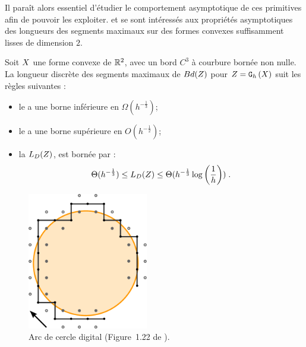 Il paraît alors essentiel d'étudier le comportement asymptotique de ces
primitives afin de pouvoir les exploiter.  et
 se sont intéressés aux
propriétés asymptotiques des longueurs des segments maximaux sur des formes
convexes suffisamment lisses de dimension $2$.
%
\begin{lemma}{}
  \label{lem:law-length-MDSS}
  Soit $X$ une forme convexe de $\mathbb{R}^2$, avec un bord $C^3$ à
  courbure bornée non nulle. La longueur discrète des segments maximaux de
  $Bd({Z})$ pour $Z = \mathtt{G}_{h}\left(X\right)$ suit les règles suivantes :
  \begin{itemize}
    \item le  a une borne inférieure en
    $\Omega(h^{-\frac{1}{3}})$;
    \item le  a une borne supérieure en
    $O(h^{-\frac{1}{2}})$;
    \item la  $L_D({Z})$, est
    bornée par :
    \begin{equation}
      \label{eq:lengthMS}
      \Theta(h^{-\frac{1}{3}}) \le L_D( {Z} ) \le \Theta(h^{-\frac{1}{3}} \log \left(\frac{1}{h}\right))\;.
    \end{equation}
  \end{itemize}
\end{lemma}


\begin{figure}[ht]{
    \begin{center}
    \includegraphics[height=6cm]{figures/DCA}
    \end{center}}
    \caption[Arc de cercle digital.]{Arc de cercle digital (Figure~1.22 de \cite{Roussillon2009}).\label{fig:dca-figure}}
\end{figure}



